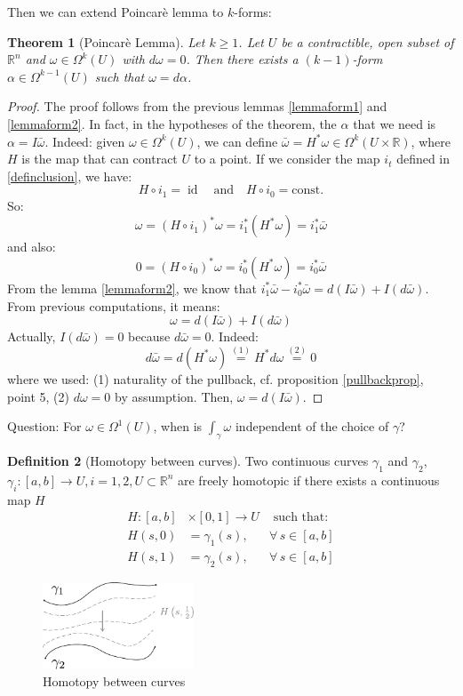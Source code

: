 \documentclass[a4paper,11pt,titlepage, article, oneside]{memoir}
\numberwithin{equation}{section}
\newtheorem{theorem}{Theorem}[section]
\theoremstyle{definition}
\newtheorem{definition}[theorem]{Definition}
\theoremstyle{remark}
\DeclareMathOperator{\id}{id}
\newcommand{\rfield}{\mathbb{R}}
\begin{document}
Then we can extend Poincarè lemma to $k$-forms:
\begin{theorem} [Poincarè Lemma] \label{poinclemma}
  Let $k \ge 1$. Let $U$ be a contractible, open subset of $\rfield^n$ and $\omega \in \Omega^k(U)$ with $d\omega = 0$. Then there exists a $(k-1)$-form $\alpha \in \Omega^{k-1} (U)$ such that $\omega = d\alpha$.
\end{theorem}
\begin{proof}
The proof follows from the previous lemmas  \ref{lemmaform1} and \ref{lemmaform2}. In fact, in the hypotheses of the theorem, the $\alpha$ that we need is $\alpha = I \bar \omega$. Indeed: given $\omega \in \Omega^k(U)$, we can define $\bar \omega = H^* \omega \in \Omega^k(U \times \rfield)$, where $H$ is the map that can contract $U$ to a point. If we consider the map $i_t$ defined in \eqref{definclusion}, we have:
$$H \circ i_1 = \id \quad \text{and} \quad H \circ i_0 = \text{const.}$$
So:
$$\omega = (H \circ i_1)^* \omega = i_1^* (H^* \omega) = i_1^* \bar \omega$$
and also:
$$0 = (H \circ i_0)^* \omega = i_0^* (H^* \omega) = i_0^* \bar \omega$$
From the lemma \ref{lemmaform2}, we know that $i_1^* \bar \omega - i_0^* \bar \omega = d(I \bar \omega) + I(d \bar \omega) $. From previous computations, it means:
$$\omega = d(I \bar \omega) + I (d \bar \omega)$$
Actually, $I (d \bar \omega) = 0$ because $d \bar \omega = 0$. Indeed:
$$d \bar \omega = d(H^* \omega) \overset{(1)}{=} H^* d \omega \overset{(2)}{=} 0$$
where we used: (1) naturality of the pullback, cf. proposition \ref{pullbackprop}, point 5, (2) $d \omega = 0$ by assumption.
Then, $\omega = d(I \bar \omega)$.
\end{proof}

Question: For $\omega \in \Omega^1(U)$, when is $\int_{\gamma}\omega$ independent of the choice of $\gamma$?

\begin{definition}[Homotopy between curves]
  Two continuous curves $\gamma_1$ and $\gamma_2$, $\gamma_i \colon [a, b] \rightarrow U, i=1,2, U \subset \rfield^n$ are freely homotopic if there exists a continuous map $H$
  \begin{align*}
    H \colon [a, b] &\times [0, 1] \rightarrow U &\text{ such that:}\\
    H(s, 0) &= \gamma_1(s), &\forall\, s \in [a, b] \\
    H(s, 1) &= \gamma_2(s), &\forall\, s \in [a, b]
  \end{align*}
  \begin{figure}[h] \label{Fig:hom1}
     \centering
     \includegraphics[width=0.4\textwidth]{Images/homotopy1.pdf} 
     \caption{Homotopy between curves}      
\end{figure}
\end{definition}
\end{document}
